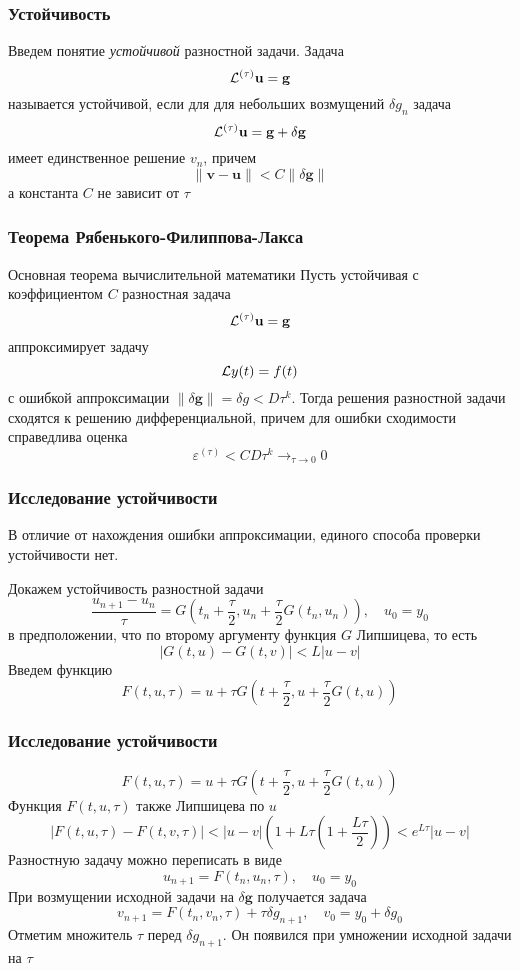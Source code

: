 \documentclass[apectratio=43,unicode]{beamer}
\begin{document}
\begin{frame}\frametitle{Устойчивость}
	Введем понятие \emph{устойчивой} разностной задачи. Задача 
	$$
	{\mathcal{L}^{(\tau)}} \mathbf{u} = \mathbf{g}
	$$
	называется устойчивой, если для для небольших возмущений $\delta g_n$ задача
	$$
	{\mathcal{L}^{(\tau)}} \mathbf{u} = \mathbf{g} + \delta \mathbf{g}
	$$
	имеет единственное решение $v_n$, причем
	$$
	\|\mathbf{v} - \mathbf{u}\| < C \|\delta \mathbf{g}\|
	$$
	а константа $C$ не зависит от $\tau$
\end{frame}

\begin{frame}\frametitle{Теорема Рябенького-Филиппова-Лакса}
	\begin{block}{Основная теорема вычислительной математики}
		Пусть устойчивая с коэффициентом $C$ разностная задача 
		$$
		{\mathcal{L}^{(\tau)}} \mathbf{u} = \mathbf{g}
		$$
		аппроксимирует задачу
		$$
		\mathcal{L} y(t) = f(t)
		$$
		с ошибкой аппроксимации $\|\delta \mathbf{g}\| = \delta g < D \tau^k$. Тогда решения разностной задачи 
		сходятся к решению дифференциальной, причем для ошибки сходимости справедлива оценка
		$$
		\varepsilon^{(\tau)} < C D \tau^k \mathop{\longrightarrow}_{\tau \rightarrow 0} 0
		$$
	\end{block}
\end{frame}

\begin{frame}\frametitle{Исследование устойчивости}
	В отличие от нахождения ошибки аппроксимации, единого способа проверки устойчивости нет.

	Докажем устойчивость разностной задачи
	$$
	\frac{u_{n+1}-u_n}{\tau} = G\left(t_n+\frac{\tau}{2},u_n + \frac{\tau}{2}G(t_n, u_n)\right),\quad u_0 = y_0
	$$
	в предположении, что по второму аргументу функция $G$ Липшицева, то есть
	$$
	|G(t, u) - G(t, v)| < L|u-v|
	$$
	Введем функцию
	$$
	F(t, u, \tau) = u+\tau G\left(t+\frac{\tau}{2},u+\frac{\tau}{2}G(t,u)\right)
	$$
\end{frame}

\begin{frame}\frametitle{Исследование устойчивости}
	$$
	F(t, u, \tau) = u+\tau G\left(t+\frac{\tau}{2},u+\frac{\tau}{2}G(t,u)\right)
	$$
	Функция $F(t,u,\tau)$ также Липшицева по $u$
	$$
	|F(t,u,\tau)-F(t,v,\tau)| < |u-v| \left(1 + L\tau\left(1+\frac{L\tau}{2}\right)\right) < e^{L\tau} |u-v|
	$$
	Разностную задачу можно переписать в виде
	$$
	u_{n+1} = F(t_n, u_n, \tau), \quad u_0 = y_0
	$$
	При возмущении исходной задачи на $\delta \mathbf{g}$ получается задача
	$$
	v_{n+1} = F(t_n, v_n, \tau) + \tau \delta g_{n+1}, \quad v_0 = y_0 + \delta g_0
	$$
	Отметим множитель $\tau$ перед $\delta g_{n+1}$. Он появился при умножении исходной задачи на $\tau$
\end{frame}
\end{document}
